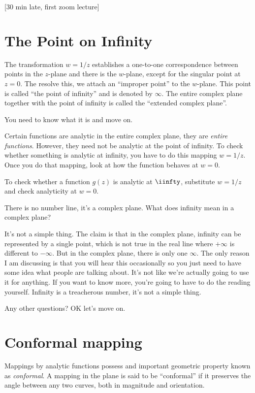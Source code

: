 [30 min late, first zoom lecture]

\section{The Point on Infinity}
The transformation $w=1/z$ establishes a one-to-one correspondence between
points in the $z$-plane and there is the $w$-plane,
except for the singular point at $z=0$.
The resolve this,
we attach an ``improper point'' to the $w$-plane.
This point is called ``the point of infinity''
and is denoted by $\infty$.
The entire complex plane together with the point of infinity is called the
``extended complex plane''.

You need to know what it is and move on.

Certain functions are analytic in the entire complex plane,
they are \emph{entire functions}.
However, they need not be analytic at the point of infinity.
To check whether something is analytic at infinity,
you have to do this mapping $w=1/z$.
Once you do that mapping,
look at how the function behaves at $w=0$.

To check whether a function $g(z)$ is analytic at $\iinfty$,
substitute $w=1/z$ and check analyticity at $w=0$.

\begin{question}
    There is no number line,
    it's a complex plane.
    What does infinity mean in a complex plane?
\end{question}
It's not a simple thing.
The claim is that in the complex plane,
infinity can be represented by a single point,
which is not true in the real line where $+\infty$
is different to $-\infty$.
But in the complex plane,
there is only one $\infty$.
The only reason I am discussing is that you will hear this occasionally so you
just need to have some idea what people are talking about.
It's not like we're actually going to use it for anything.
If you want to know more,
you're going to have to do the reading yourself.
Infinity is a treacherous number,
it's not a simple thing.

Any other questions?
OK let's move on.

\section{Conformal mapping}
Mappings by analytic functions possess and important geometric property known as
\emph{conformal}.
A mapping in the plane is said to be ``conformal''
if it preserves the angle between any two curves,
both in magnitude and orientation.

